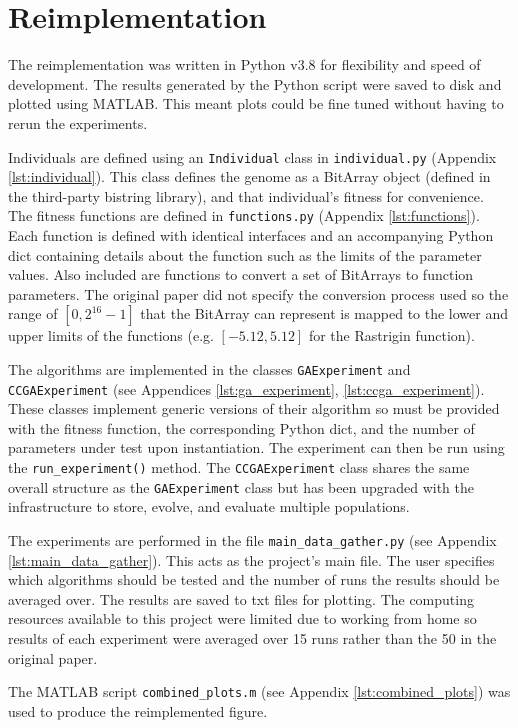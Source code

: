 \section{Reimplementation} \label{sec:reimplementation}

The reimplementation was written in Python v3.8 for flexibility and speed of development.
The results generated by the Python script were saved to disk and plotted using MATLAB.
This meant plots could be fine tuned without having to rerun the experiments.

Individuals are defined using an \texttt{Individual} class in \texttt{individual.py} (Appendix \ref{lst:individual}). 
This class defines the genome as a BitArray object (defined in the third-party bistring library\cite{bistring-repo}), and that individual's fitness for convenience.
The fitness functions are defined in \texttt{functions.py} (Appendix \ref{lst:functions}). 
Each function is defined with identical interfaces and an accompanying Python dict containing details about the function such as the limits of the parameter values.
Also included are functions to convert a set of BitArrays to function parameters.
The original paper did not specify the conversion process used so the range of $[0, 2^{16} - 1]$ that the BitArray can represent is mapped to the lower and upper limits of the functions (e.g. $[-5.12, 5.12]$ for the Rastrigin function).

The algorithms are implemented in the classes \texttt{GAExperiment} and \texttt{CCGAExperiment} (see Appendices \ref{lst:ga_experiment}, \ref{lst:ccga_experiment}). 
These classes implement generic versions of their algorithm so must be provided with the fitness function, the corresponding Python dict, and the number of parameters under test upon instantiation.
The experiment can then be run using the \texttt{run\_experiment()} method.
The \texttt{CCGAExperiment} class shares the same overall structure as the \texttt{GAExperiment} class but has been upgraded with the infrastructure to store, evolve, and evaluate multiple populations.

The experiments are performed in the file \texttt{main\_data\_gather.py} (see Appendix \ref{lst:main_data_gather}).
This acts as the project's main file.
The user specifies which algorithms should be tested and the number of runs the results should be averaged over.
The results are saved to txt files for plotting.
The computing resources available to this project were limited due to working from home so results of each experiment were averaged over 15 runs rather than the 50 in the original paper.

The MATLAB script \texttt{combined\_plots.m} (see Appendix \ref{lst:combined_plots}) was used to produce the reimplemented figure.
